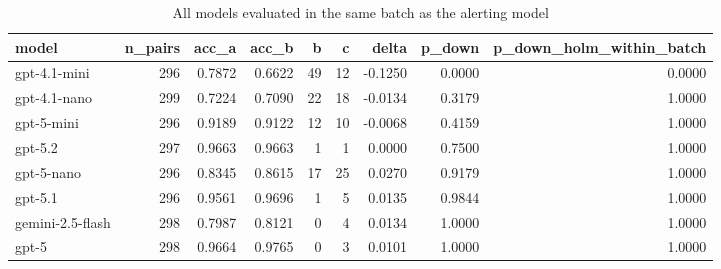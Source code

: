 \begin{table}
\caption{All models evaluated in the same batch as the alerting model}
\label{tab:table-alert-controls}
\begin{tabular}{lrrrrrrrr}
\toprule
model & n\_pairs & acc\_a & acc\_b & b & c & delta & p\_down & p\_down\_holm\_within\_batch \\
\midrule
gpt-4.1-mini & 296 & 0.7872 & 0.6622 & 49 & 12 & -0.1250 & 0.0000 & 0.0000 \\
gpt-4.1-nano & 299 & 0.7224 & 0.7090 & 22 & 18 & -0.0134 & 0.3179 & 1.0000 \\
gpt-5-mini & 296 & 0.9189 & 0.9122 & 12 & 10 & -0.0068 & 0.4159 & 1.0000 \\
gpt-5.2 & 297 & 0.9663 & 0.9663 & 1 & 1 & 0.0000 & 0.7500 & 1.0000 \\
gpt-5-nano & 296 & 0.8345 & 0.8615 & 17 & 25 & 0.0270 & 0.9179 & 1.0000 \\
gpt-5.1 & 296 & 0.9561 & 0.9696 & 1 & 5 & 0.0135 & 0.9844 & 1.0000 \\
gemini-2.5-flash & 298 & 0.7987 & 0.8121 & 0 & 4 & 0.0134 & 1.0000 & 1.0000 \\
gpt-5 & 298 & 0.9664 & 0.9765 & 0 & 3 & 0.0101 & 1.0000 & 1.0000 \\
\bottomrule
\end{tabular}
\end{table}
